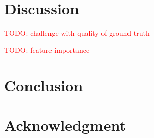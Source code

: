 \documentclass[journal]{IEEEtran}
\newcommand\TODO[1]{\textcolor{red}{TODO: #1}}
\begin{document}
\section{Discussion}
\TODO{challenge with quality of ground truth}

\TODO{feature importance}


\section{Conclusion}

\section*{Acknowledgment}



\end{document}

